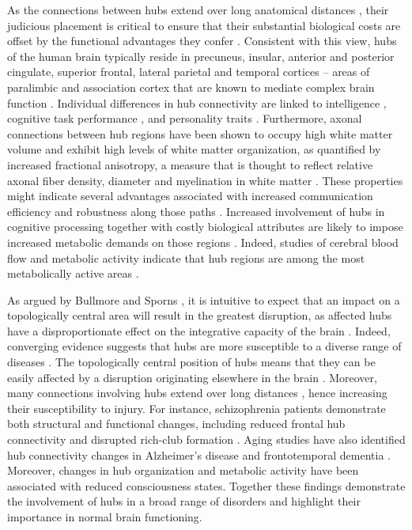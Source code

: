 As the connections between hubs extend over long anatomical distances \citep{Fulcher2016,Towlson2013,VandenHeuvel2011}, their judicious placement is critical to ensure that their substantial biological costs are offset by the functional advantages they confer \citep{DeReus2014,Towlson2013}. Consistent with this view, hubs of the human brain typically reside in precuneus, insular, anterior and posterior cingulate, superior frontal, lateral parietal and temporal cortices \citep{Gong2009,VandenHeuvel2012,VandenHeuvel2013a} -- areas of paralimbic and association cortex that are known to mediate complex brain function \citep{Buckner2009,Mesulam1998}. Individual differences in hub connectivity are linked to intelligence \citep{Li2009,VandenHeuvel2009}, cognitive task performance \mbox{\citep{Cole2012}}, and personality traits \citep{Adelstein2011}. Furthermore, axonal connections between hub regions have been shown to occupy high white matter volume and exhibit high levels of white matter organization, as quantified by increased fractional anisotropy, a measure that is thought to reflect relative axonal fiber density, diameter and myelination in white matter \mbox{\citep{Collin2014}}. These properties might indicate several advantages associated with increased communication efficiency and robustness along those paths \mbox{\citep{Collin2014}}. Increased involvement of hubs in cognitive processing \citep{Buckner2009,Cole2012,Mesulam1998} together with costly biological attributes are likely to impose increased metabolic demands on those regions \mbox{\citep{Collin2014}}. Indeed, studies of cerebral blood flow and metabolic activity indicate that hub regions are among the most metabolically active areas \mbox{\citep{Vaishnavi2010,Varkuti2011}}.

As argued by Bullmore and Sporns \citep{Bullmore2012}, it is intuitive to expect that an impact on a topologically central area will result in the greatest disruption, as affected hubs have a disproportionate effect on the integrative capacity of the brain \mbox{\citep{DeReus2014}}. Indeed, converging evidence suggests that hubs are more susceptible to a diverse range of diseases \citep{Bassett2009a,Crossley2014,Fornito2015}. The topologically central position of hubs means that they can be easily affected by a disruption originating elsewhere in the brain \citep{Zhou2012}. Moreover, many connections involving hubs extend over long distances \citep{VandenHeuvel2012}, hence increasing their susceptibility to injury. For instance, schizophrenia patients demonstrate both structural and functional changes, including reduced frontal hub connectivity \citep{Fornito2012a,VandenHeuvel2010,Zalesky2011} and disrupted rich-club formation \citep{VandenHeuvel2013c}. Aging studies have also identified hub connectivity changes in Alzheimer’s disease \citep{DeHaan2012,Stam2009} and frontotemporal dementia \citep{Agosta2013}. Moreover, changes in hub organization \citep{Achard2012} and metabolic activity \citep{Laureys2004} have been associated with reduced consciousness states. Together these findings demonstrate the involvement of hubs in a broad range of disorders and highlight their importance in normal brain functioning.

